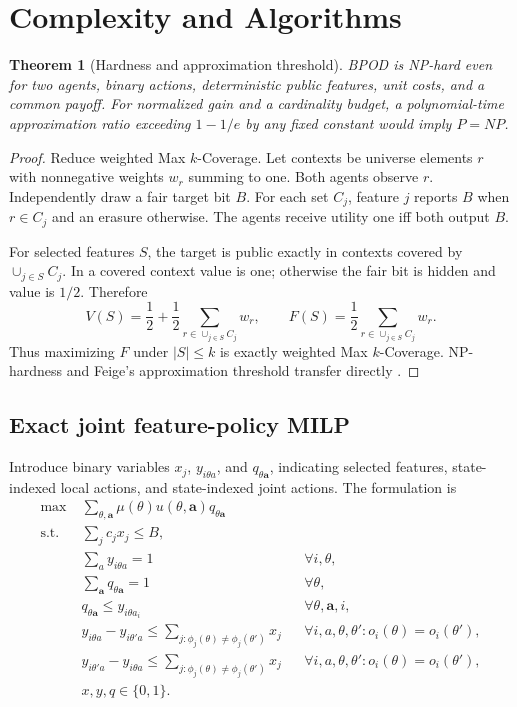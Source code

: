 \documentclass[11pt]{article}
\newtheorem{theorem}{Theorem}
\begin{document}
\section{Complexity and Algorithms}
\begin{theorem}[Hardness and approximation threshold]\label{thm:hard-supp}
BPOD is NP-hard even for two agents, binary actions, deterministic public features, unit costs, and a common payoff. For normalized gain and a cardinality budget, a polynomial-time approximation ratio exceeding $1-1/e$ by any fixed constant would imply $P=NP$.
\end{theorem}
\begin{proof}
Reduce weighted Max $k$-Coverage. Let contexts be universe elements $r$ with nonnegative weights $w_r$ summing to one. Both agents observe $r$. Independently draw a fair target bit $B$. For each set $C_j$, feature $j$ reports $B$ when $r\in C_j$ and an erasure otherwise. The agents receive utility one iff both output $B$.

For selected features $S$, the target is public exactly in contexts covered by $\cup_{j\in S}C_j$. In a covered context value is one; otherwise the fair bit is hidden and value is $1/2$. Therefore
\[
V(S)=\frac12+\frac12\sum_{r\in\cup_{j\in S}C_j}w_r,
\qquad
F(S)=\frac12\sum_{r\in\cup_{j\in S}C_j}w_r.
\]
Thus maximizing $F$ under $|S|\le k$ is exactly weighted Max $k$-Coverage. NP-hardness and Feige's approximation threshold transfer directly \cite{Feige1998}.
\end{proof}

\subsection{Exact joint feature-policy MILP}
Introduce binary variables $x_j$, $y_{i\theta a}$, and $q_{\theta\mathbf a}$, indicating selected features, state-indexed local actions, and state-indexed joint actions. The formulation is
\begin{align*}
\max\;&\sum_{\theta,\mathbf a}\mu(\theta)u(\theta,\mathbf a)q_{\theta\mathbf a}\\
\text{s.t. }&\sum_jc_jx_j\le B,\\
&\sum_a y_{i\theta a}=1 &&\forall i,\theta,\\
&\sum_{\mathbf a}q_{\theta\mathbf a}=1 &&\forall\theta,\\
&q_{\theta\mathbf a}\le y_{i\theta a_i} &&\forall\theta,\mathbf a,i,\\
&y_{i\theta a}-y_{i\theta'a}\le
 \sum_{j:\phi_j(\theta)\ne\phi_j(\theta')}x_j
 &&\forall i,a,\theta,\theta':o_i(\theta)=o_i(\theta'),\\
&y_{i\theta'a}-y_{i\theta a}\le
 \sum_{j:\phi_j(\theta)\ne\phi_j(\theta')}x_j
 &&\forall i,a,\theta,\theta':o_i(\theta)=o_i(\theta'),\\
&x,y,q\in\{0,1\}.
\end{align*}
\end{document}
